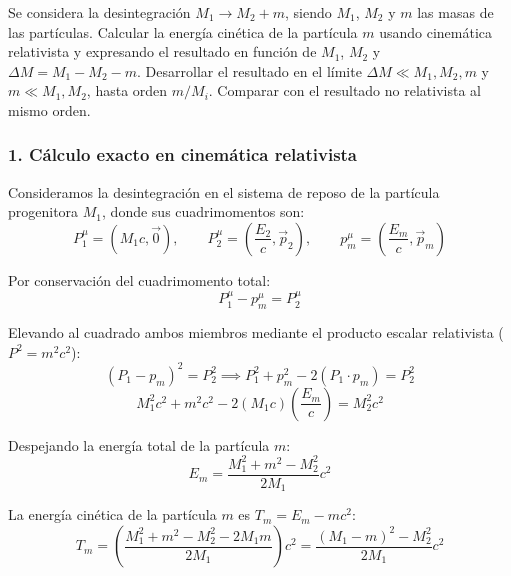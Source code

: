 \newpage
\begin{problema}
Se considera la desintegración $M_1 \rightarrow M_2 + m$, siendo $M_1$, $M_2$ y $m$ las masas de las partículas.
Calcular la energía cinética de la partícula $m$ usando cinemática relativista y expresando el resultado en función de $M_1$, $M_2$ y $\Delta M = M_1 - M_2 - m$. Desarrollar el resultado en el límite $\Delta M \ll M_1, M_2, m$ y $m \ll M_1, M_2$, hasta orden $m/M_i$. Comparar con el resultado no relativista al mismo orden.

\tcblower

\subsubsection*{1. Cálculo exacto en cinemática relativista}

Consideramos la desintegración en el sistema de reposo de la partícula progenitora $M_1$, donde sus cuadrimomentos son:
\begin{equation*}
P_1^\mu = (M_1 c, \vec{0}), \qquad P_2^\mu = \left(\frac{E_2}{c}, \vec{p}_2\right), \qquad p_m^\mu = \left(\frac{E_m}{c}, \vec{p}_m\right)
\end{equation*}

Por conservación del cuadrimomento total:
\begin{equation*}
P_1^\mu - p_m^\mu = P_2^\mu
\end{equation*}

Elevando al cuadrado ambos miembros mediante el producto escalar relativista ($P^2 = m^2 c^2$):
\begin{equation*}
(P_1 - p_m)^2 = P_2^2 \implies P_1^2 + p_m^2 - 2 (P_1 \cdot p_m) = P_2^2
\end{equation*}
\begin{equation*}
M_1^2 c^2 + m^2 c^2 - 2 (M_1 c) \left(\frac{E_m}{c}\right) = M_2^2 c^2
\end{equation*}

Despejando la energía total de la partícula $m$:
\begin{equation*}
E_m = \frac{M_1^2 + m^2 - M_2^2}{2 M_1} c^2
\end{equation*}

La energía cinética de la partícula $m$ es $T_m = E_m - m c^2$:
\begin{equation*}
T_m = \left( \frac{M_1^2 + m^2 - M_2^2 - 2 M_1 m}{2 M_1} \right) c^2 = \frac{(M_1 - m)^2 - M_2^2}{2 M_1} c^2
\end{equation*}


\end{problema}
